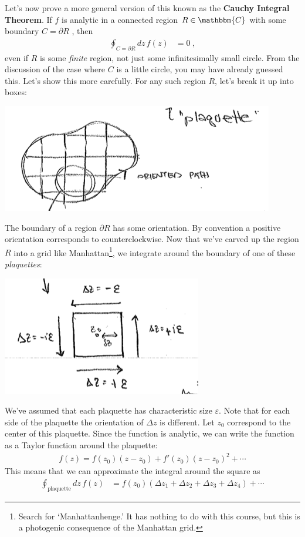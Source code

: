 Let's now prove a more general version of this known as the \textbf{Cauchy Integral Theorem}. If $f$ is analytic in a connected region $R \in \mathbbm{C}$ with some boundary $C = \partial R$ , then 
\begin{align}
	\oint_{C=\partial R} dz\, f(z) &= 0 \ ,
\end{align}
even if $R$ is some \emph{finite} region, not just some infinitesimally small circle. From the discussion of the case where $C$ is a little circle, you may have already guessed this. Let's show this more carefully. For any such region $R$, let's break it up into boxes:
\begin{center}
\includegraphics[width=.5\textwidth]{figures/Lec_2017_12_plaquette.png}
\end{center}
The boundary of a region $\partial R$ has some orientation. By convention a positive orientation corresponds to counterclockwise. Now that we've carved up the region $R$ into a grid like Manhattan\footnote{Search for `Manhattanhenge.' It has nothing to do with this course, but this is a photogenic consequence of the Manhattan grid.}, we integrate around the boundary of one of these \emph{plaquettes}:
\begin{center}
\includegraphics[width=.4\textwidth]{figures/Lec_2017_plaq_int.png}
\end{center}
We've assumed that each plaquette has characteristic size $\varepsilon$. Note that for each side of the plaquette the orientation of $\Delta z$ is different. Let $z_0$ correspond to the center of this plaquette. Since the function is analytic, we can write the function as a Taylor function around the plaquette:
\begin{align}
	f(z) = f(z_0)(z-z_0) + f'(z_0) (z-z_0)^2 + \cdots
\end{align}
This means that we can approximate the integral around the square as
\begin{align}
	\oint_\text{plaquette} dz\,  f(z)
	&= 
	f(z_0)
	\left(
		\Delta z_1 + \Delta z_2 + \Delta z_3 + \Delta z_4
	\right)
	+ \cdots
\end{align}

